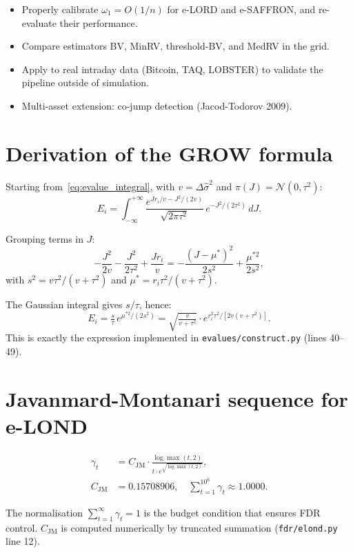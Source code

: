 \documentclass[11pt,a4paper,twocolumn]{article}
\theoremstyle{plain}
\theoremstyle{definition}
\theoremstyle{remark}
\newcommand{\dt}{\Delta}
\begin{document}
\begin{itemize}
  \item Properly calibrate $\omega_1 = O(1/n)$ for e-LORD and e-SAFFRON,
    and re-evaluate their performance.
  \item Compare estimators BV, MinRV, threshold-BV, and MedRV in the grid.
  \item Apply to real intraday data (Bitcoin, TAQ, LOBSTER) to validate
    the pipeline outside of simulation.
  \item Multi-asset extension: co-jump detection (Jacod-Todorov 2009).
\end{itemize}

\appendix

\section{Derivation of the GROW formula}
\label{ann:grow}

Starting from~\eqref{eq:evalue_integral}, with $v = \dt\hat{\sigma}^2$ and
$\pi(J) = \mathcal{N}(0, \tau^2)$:
\[
  E_i = \int_{-\infty}^{+\infty}
    \frac{e^{Jr_i/v - J^2/(2v)}}{\sqrt{2\pi\tau^2}}\,
    e^{-J^2/(2\tau^2)}\, dJ.
\]

Grouping terms in $J$:
\[
  -\frac{J^2}{2v} - \frac{J^2}{2\tau^2} + \frac{Jr_i}{v}
  = -\frac{(J - \mu^*)^2}{2s^2} + \frac{\mu^{*2}}{2s^2},
\]
with $s^2 = v\tau^2/(v+\tau^2)$ and $\mu^* = r_i\tau^2/(v+\tau^2)$.

The Gaussian integral gives $s/\tau$, hence:
\[
  E_i = \tfrac{s}{\tau}\, e^{\mu^{*2}/(2s^2)}
  = \sqrt{\tfrac{v}{v+\tau^2}} \cdot e^{r_i^2\tau^2/[2v(v+\tau^2)]}.
\]
This is exactly the expression implemented in \texttt{evalues/construct.py}
(lines 40--49).

\section{Javanmard-Montanari sequence for e-LOND}
\label{ann:jm}

\begin{align*}
  \gamma_t &= C_\mathrm{JM} \cdot \frac{\log\max(t,2)}{t \cdot e^{\sqrt{\log\max(t,2)}}},\\
  C_\mathrm{JM} &= 0.15708906,\quad
  \sum_{t=1}^{10^6} \gamma_t \approx 1.0000.
\end{align*}

The normalisation $\sum_{t=1}^\infty \gamma_t = 1$ is the budget condition
that ensures FDR control. $C_\mathrm{JM}$ is computed numerically by
truncated summation (\texttt{fdr/elond.py} line 12).
\end{document}
